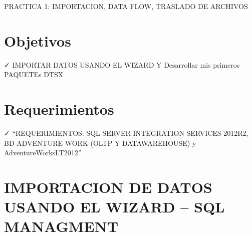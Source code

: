 
PRACTICA 1: IMPORTACION, DATA FLOW, TRASLADO DE ARCHIVOS
\section{Objetivos}
✓ IMPORTAR DATOS USANDO EL WIZARD Y Desarrollar mis primeros PAQUETEs DTSX

\section{Requerimientos}

✓ “REQUERIMIENTOS: SQL SERVER INTEGRATION SERVICES 2012R2, BD ADVENTURE WORK (OLTP Y DATAWAREHOUSE) y AdventureWorksLT2012”
\\

\section{IMPORTACION DE DATOS USANDO EL WIZARD – SQL MANAGMENT}
